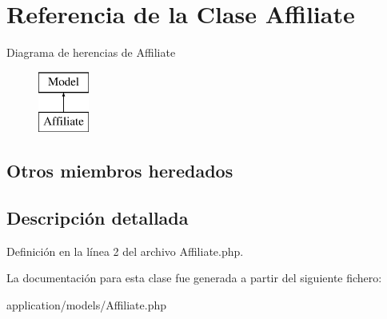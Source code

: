 \hypertarget{class_affiliate}{}\section{Referencia de la Clase Affiliate}
\label{class_affiliate}
Diagrama de herencias de Affiliate\begin{figure}[H]
\begin{center}
\leavevmode
\includegraphics[height=2.000000cm]{class_affiliate}
\end{center}
\end{figure}
\subsection*{Otros miembros heredados}


\subsection{Descripción detallada}


Definición en la línea 2 del archivo Affiliate.\+php.



La documentación para esta clase fue generada a partir del siguiente fichero\+:\begin{DoxyCompactItemize}
\item 
application/models/Affiliate.\+php\end{DoxyCompactItemize}
